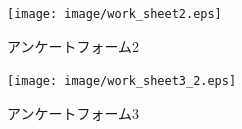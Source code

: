 \begin{figure}[htbp]
    \begin{center}
        \centering
        \texttt{[image: image/work\_sheet2.eps]}
        \caption{アンケートフォーム2}
        \label{work_sheet2}
    \end{center}
\end{figure}

\begin{figure}[htbp]
    \begin{center}
        \centering
        \texttt{[image: image/work\_sheet3\_2.eps]}
        \caption{アンケートフォーム3}
        \label{work_sheet3}
    \end{center}
\end{figure}
